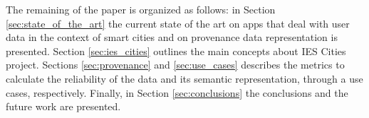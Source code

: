 The remaining of the paper is organized as follows: in Section \ref{sec:state_of_the_art} the current state of the art on apps that deal with user data in the context of smart cities and on provenance data representation is presented. Section \ref{sec:ies_cities} outlines the main concepts about IES Cities project. Sections \ref{sec:provenance} and \ref{sec:use_cases} describes the metrics to calculate the reliability of the data and its semantic representation, through a use cases, respectively. Finally, in Section \ref{sec:conclusions} the conclusions and the future work are presented.
